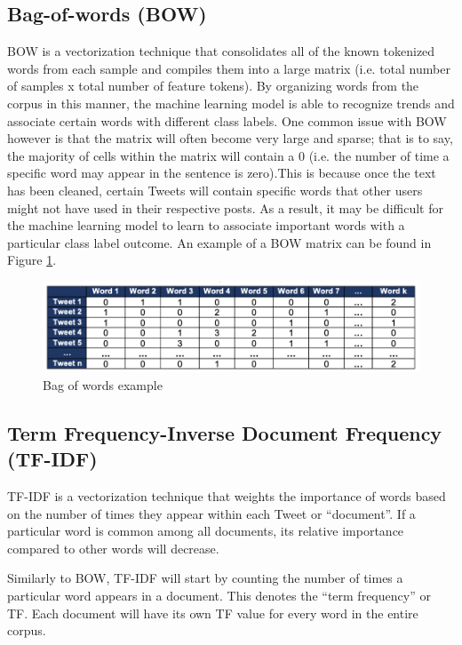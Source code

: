 \documentclass[12pt]{article}
\begin{document}
\subsection{Bag-of-words (BOW)}
BOW is a vectorization technique that consolidates all of the known tokenized words from each sample and compiles them into a large matrix (i.e. total number of samples x total number of feature tokens). By organizing words from the corpus in this manner, the machine learning model is able to recognize trends and associate certain words with different class labels.
One common issue with BOW however is that the matrix will often become very large and sparse; that is to say, the majority of cells within the matrix will contain a 0 (i.e. the number of time a specific word may appear in the sentence is zero).This is because once the text has been cleaned, certain Tweets will contain specific words that other users might not have used in their respective posts.  As a result, it may be difficult for the machine learning model to learn to associate important words with a particular class label outcome.  An example of a BOW matrix can be found in Figure \ref{fig:bow}.

\begin{figure}[tbp]
\centering 
\includegraphics[width=1\textwidth]{figures/bow}
\caption{Bag of words example} 
\label{fig:bow}
\end{figure}

\subsection{Term Frequency-Inverse Document Frequency (TF-IDF)}
TF-IDF is a vectorization technique that weights the importance of words based on the number of times they appear within each Tweet or “document”.  If a particular word is common among all documents, its relative importance compared to other words will decrease. 

Similarly to BOW, TF-IDF will start by counting the number of times a particular word appears in a document.  This denotes the “term frequency” or TF.  Each document will have its own TF value for every word in the entire corpus.  
\end{document}

